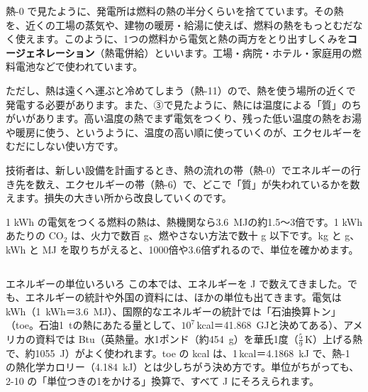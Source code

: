 \begin{phkougaku}
熱-0 で見たように、発電所は燃料の熱の半分くらいを捨てています。その熱を、近くの工場の蒸気や、建物の暖房・給湯に使えば、燃料の熱をもっとむだなく使えます。このように、1つの燃料から電気と熱の両方をとり出すしくみを\textbf{コージェネレーション}（熱電併給）といいます。工場・病院・ホテル・家庭用の燃料電池などで使われています。

ただし、熱は遠くへ運ぶと冷めてしまう（熱-11）ので、熱を使う場所の近くで発電する必要があります。また、③で見たように、熱には温度による「質」のちがいがあります。高い温度の熱でまず電気をつくり、残った低い温度の熱をお湯や暖房に使う、というように、温度の高い順に使っていくのが、エクセルギーをむだにしない使い方です。

技術者は、新しい設備を計画するとき、熱の流れの帯（熱-0）でエネルギーの行き先を数え、エクセルギーの帯（熱-6）で、どこで「質」が失われているかを数えます。損失の大きい所から改良していくのです。
\begin{phketa}[エネルギーを選ぶときの数]
1 kWh の電気をつくる燃料の熱は、熱機関なら\qty{3.6}{MJ}の約1.5〜3倍です。1 kWh あたりの CO$_2$ は、火力で数百 g、燃やさない方法で数十 g 以下です。kg と g、kWh と MJ を取りちがえると、1000倍や3.6倍ずれるので、単位を確かめます。
\end{phketa}
\end{phkougaku}

\begin{column}{エネルギーの単位いろいろ}
この本では、エネルギーを J で数えてきました。でも、エネルギーの統計や外国の資料には、ほかの単位も出てきます。電気は kWh（\qty{1}{kWh}＝\qty{3.6}{MJ}）、国際的なエネルギーの統計では「石油換算トン」（toe。石油\qty{1}{t}の熱にあたる量として、$10^7$\,kcal＝\qty{41.868}{GJ}と決めてある）、アメリカの資料では Btu（英熱量。水1ポンド（約\qty{454}{g}）を華氏1度（$\tfrac59$\,K）上げる熱で、約\qty{1055}{J}）がよく使われます。toe の kcal は、1\,kcal＝\qty{4.1868}{kJ} で、熱-1 の熱化学カロリー（\qty{4.184}{kJ}）とは少しちがう決め方です。単位がちがっても、2-10 の「単位つきの1をかける」換算で、すべて J にそろえられます。
\end{column}


